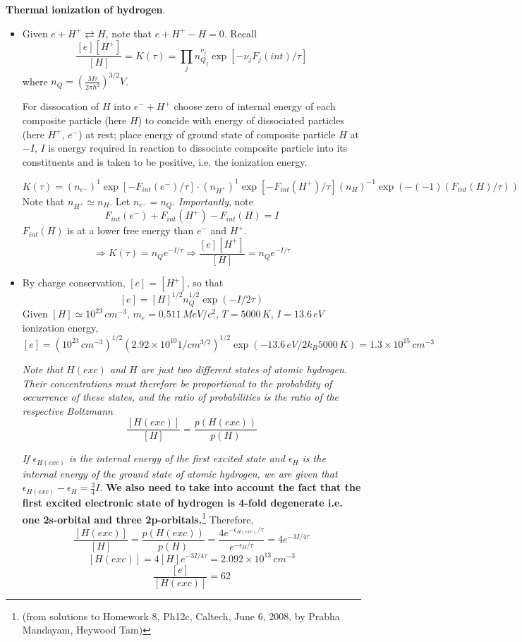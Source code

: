  \textbf{Thermal ionization of hydrogen}.  
\begin{itemize}
\item[(a)] Given $e + H^+ \rightleftarrows H$, note that $e + H^+ - H =0$.  Recall
\[
\frac{ [e][H^+] }{ [H] } = K(\tau) = \prod_j n_{Q_j}^{\nu_j} \exp{ [ -\nu_j F_j(int) /\tau ] }
\]
where $n_Q = \left( \frac{ M \tau}{2\pi \hbar^2 } \right)^{3/2} V$.  

For dissocation of $H$ into $e^- + H^+$ choose zero of internal energy of each composite particle (here $H$) to concide with energy of dissociated particles (here $H^+$, $e^-$) at rest; place energy of ground state of composite particle $H$ at $-I$, $I$ is energy required in reaction to dissociate composite particle into its constituents and is taken to be positive, i.e. the ionization energy.  

\[
K(\tau) = (n_{e^-})^1 \exp{ [- F_{int}(e^-)/\tau ]} \cdot (n_{H^+} )^1 \exp{ [ -F_{int}(H^+)/ \tau ] } (n_{H})^{-1} \exp{ (- (-1) (F_{int}(H)/\tau) )}
\]
Note that $n_{H^+} \simeq n_{H}$.  Let $n_{e^-} = n_Q$.  \emph{Importantly}, note
\[
\boxed{ F_{int}(e^-) + F_{int}(H^+) - F_{int}(H) = I }
\]
$F_{int}(H)$ is at a lower free energy than $e^-$ and $H^+$.  
\[
\Longrightarrow K(\tau) = n_Q e^{-I/\tau} \Longrightarrow \boxed{ \frac{ [e][H^+] }{ [H] } = n_Qe^{-I/\tau}  }
\]

\item[(b)] By charge conservation, $[e] = [H^+]$, so that 
\[
[e] = [H]^{1/2} n_Q^{1/2} \exp{ (-I/2\tau)}
\]
Given $[H] \simeq 10^{23} \, cm^{-3}$, $m_e = 0.511 \, MeV/c^2$, $T = 5000 \, K$, $I = 13.6 \, eV$ ionization energy,
\[
[e] = (10^{23} \, cm^{-3})^{1/2} ( 2.92 \times 10^{10} 1/cm^{3/2})^{1/2} \exp{ ( - 13.6 \, eV / 2 k_B 5000 \, K) } =  1.3 \times 10^{15} \, cm^{-3}
\]

\emph{Note that $H(exc)$ and $H$ are just two different states of atomic hydrogen.  Their concentrations must therefore be proportional to the probability of occurrence of these states, and the ratio of probabilities is the ratio of the respective Boltzmann}
\[
\frac{ [H(exc) ] }{[H] } = \frac{p(H(exc) )}{ p(H) }
\]

\emph{If $\epsilon_{H(exc)}$ is the internal energy of the first excited state and $\epsilon_H$ is the internal energy of the ground state of atomic hydrogen, we are given that $\epsilon_{H(exc)} - \epsilon_H = \frac{3}{4} I$}.  \textbf{We also need to take into account the fact that the first excited electronic state of hydrogen is 4-fold degenerate i.e. one 2s-orbital and three 2p-orbitals.}\footnote{(from solutions to Homework 8, Ph12c, Caltech, June 6, 2008, by Prabha Mandayam, Heywood Tam)} Therefore,
\[
\frac{ [H(exc)]}{[H]} = \frac{ p(H(exc)) }{ p(H)} = \frac{ 4e^{-\epsilon_{H(exc)}/\tau } }{ e^{-\epsilon_H/\tau} } = 4 e^{-3I/4\tau}
\]   
\[
[H(exc)] = 4[H] e^{-3I/4\tau} = \boxed{ 2.092 \times 10^{13} \, cm^{-3} }
\]
\[
\frac{ [e] }{ [H(exc) ]} = 62
\]

\end{itemize}



